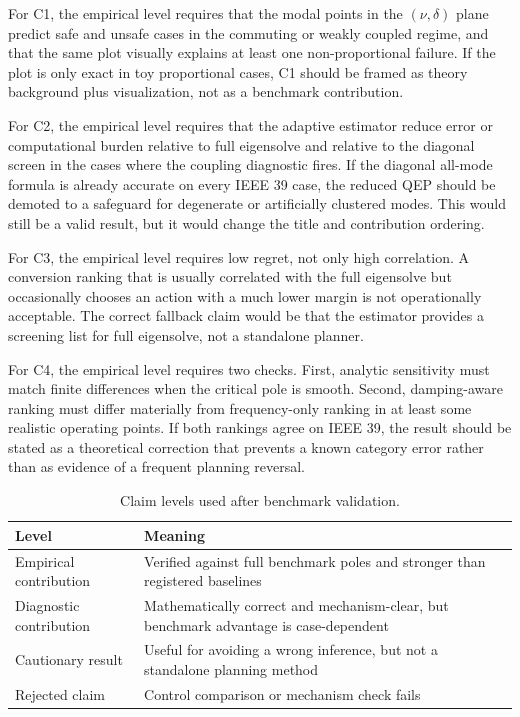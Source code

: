 \documentclass[journal]{IEEEtran}
\begin{document}
For C1, the empirical level requires that the modal points in the $(\nu,\delta)$ plane predict safe and unsafe cases in the commuting or weakly coupled regime, and that the same plot visually explains at least one non-proportional failure. If the plot is only exact in toy proportional cases, C1 should be framed as theory background plus visualization, not as a benchmark contribution.

For C2, the empirical level requires that the adaptive estimator reduce error or computational burden relative to full eigensolve and relative to the diagonal screen in the cases where the coupling diagnostic fires. If the diagonal all-mode formula is already accurate on every IEEE 39 case, the reduced QEP should be demoted to a safeguard for degenerate or artificially clustered modes. This would still be a valid result, but it would change the title and contribution ordering.

For C3, the empirical level requires low regret, not only high correlation. A conversion ranking that is usually correlated with the full eigensolve but occasionally chooses an action with a much lower margin is not operationally acceptable. The correct fallback claim would be that the estimator provides a screening list for full eigensolve, not a standalone planner.

For C4, the empirical level requires two checks. First, analytic sensitivity must match finite differences when the critical pole is smooth. Second, damping-aware ranking must differ materially from frequency-only ranking in at least some realistic operating points. If both rankings agree on IEEE 39, the result should be stated as a theoretical correction that prevents a known category error rather than as evidence of a frequent planning reversal.

\begin{table}[t]
\centering
\caption{Claim levels used after benchmark validation.}
\label{tab:claimlevels}
\begin{tabular}{p{}p{}}
\toprule
Level & Meaning\\
\midrule
Empirical contribution & Verified against full benchmark poles and stronger than registered baselines\\
Diagnostic contribution & Mathematically correct and mechanism-clear, but benchmark advantage is case-dependent\\
Cautionary result & Useful for avoiding a wrong inference, but not a standalone planning method\\
Rejected claim & Control comparison or mechanism check fails\\
\bottomrule
\end{tabular}
\end{table}
\end{document}
